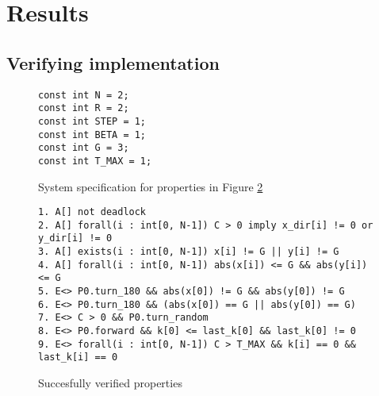 \section{Results}
\subsection{Verifying implementation}

\begin{figure}[H]
\caption{System specification for properties in Figure \ref{fig:properties_2_robots}}
\label{fig:system_2_robots}
\begin{lstlisting}[style=code]
const int N = 2;
const int R = 2;
const int STEP = 1;
const int BETA = 1;
const int G = 3;
const int T_MAX = 1;
\end{lstlisting}    
\end{figure}

\begin{figure}[H]
\caption{Succesfully verified properties}
\label{fig:properties_2_robots}
\begin{lstlisting}[style=code]
1. A[] not deadlock
2. A[] forall(i : int[0, N-1]) C > 0 imply x_dir[i] != 0 or y_dir[i] != 0
3. A[] exists(i : int[0, N-1]) x[i] != G || y[i] != G
4. A[] forall(i : int[0, N-1]) abs(x[i]) <= G && abs(y[i]) <= G
5. E<> P0.turn_180 && abs(x[0]) != G && abs(y[0]) != G
6. E<> P0.turn_180 && (abs(x[0]) == G || abs(y[0]) == G)
7. E<> C > 0 && P0.turn_random
8. E<> P0.forward && k[0] <= last_k[0] && last_k[0] != 0
9. E<> forall(i : int[0, N-1]) C > T_MAX && k[i] == 0 && last_k[i] == 0
\end{lstlisting}    
\end{figure}

